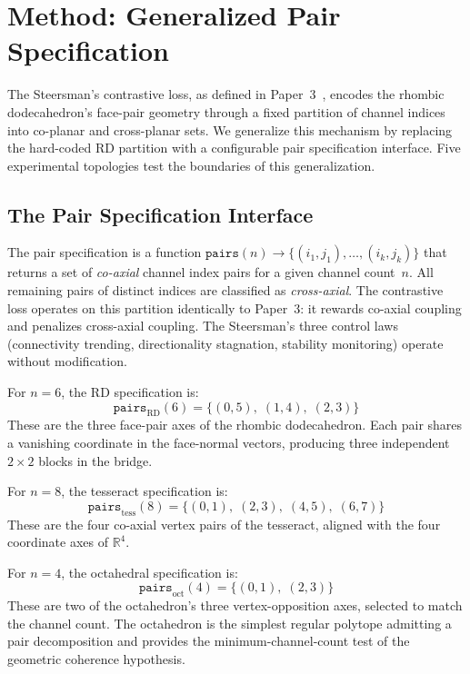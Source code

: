 \section{Method: Generalized Pair Specification}
\label{sec:method}

The Steersman's contrastive loss, as defined in
Paper~3~\cite{bielec2026bridge}, encodes the rhombic dodecahedron's
face-pair geometry through a fixed partition of channel indices into
co-planar and cross-planar sets. We generalize this mechanism by
replacing the hard-coded RD partition with a configurable pair
specification interface. Five experimental topologies test the
boundaries of this generalization.

\subsection{The Pair Specification Interface}
\label{sec:pairs}

The pair specification is a function
$\texttt{pairs}(n) \to \{(i_1, j_1), \ldots, (i_k, j_k)\}$ that
returns a set of \emph{co-axial} channel index pairs for a given
channel count~$n$. All remaining pairs of distinct indices are
classified as \emph{cross-axial}. The contrastive loss operates on
this partition identically to Paper~3: it rewards co-axial coupling
and penalizes cross-axial coupling. The Steersman's three control
laws (connectivity trending, directionality stagnation, stability
monitoring) operate without modification.

For $n = 6$, the RD specification is:
\begin{equation}
  \texttt{pairs}_{\text{RD}}(6) = \{(0,5),\; (1,4),\; (2,3)\}
  \label{eq:rd_pairs}
\end{equation}
These are the three face-pair axes of the rhombic dodecahedron. Each
pair shares a vanishing coordinate in the face-normal vectors,
producing three independent $2 \times 2$ blocks in the bridge.

For $n = 8$, the tesseract specification is:
\begin{equation}
  \texttt{pairs}_{\text{tess}}(8) = \{(0,1),\; (2,3),\; (4,5),\;
    (6,7)\}
  \label{eq:tess_pairs}
\end{equation}
These are the four co-axial vertex pairs of the tesseract, aligned
with the four coordinate axes of $\mathbb{R}^4$.

For $n = 4$, the octahedral specification is:
\begin{equation}
  \texttt{pairs}_{\text{oct}}(4) = \{(0,1),\; (2,3)\}
  \label{eq:oct_pairs}
\end{equation}
These are two of the octahedron's three vertex-opposition axes,
selected to match the channel count. The octahedron is the simplest
regular polytope admitting a pair decomposition and provides the
minimum-channel-count test of the geometric coherence hypothesis.

